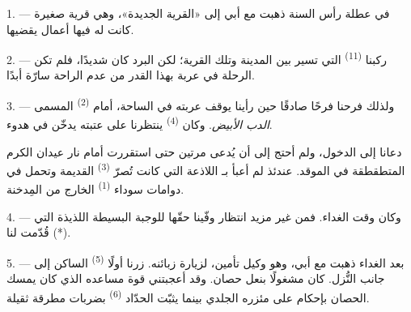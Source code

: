 

\VUsaut{4.0mm}
\VUsaut{3.0mm}
\VUfilet{16mm}
\VUsaut{5.6mm}
\VUsaut{3.0mm}

\VUsaut{3.0mm}

\VUsaut{4.0mm}

1. --- في عطلة رأس السنة ذهبت مع أبي إلى «القرية الجديدة»، وهي قرية
صغيرة كانت له فيها أعمال يقضيها.

2. --- ركبنا  \textsuperscript{(11)} التي تسير بين المدينة
وتلك القرية؛ لكن البرد كان شديدًا، فلم تكن الرحلة في عربة بهذا القدر من
عدم الراحة سارّة أبدًا.

3. --- ولذلك فرحنا فرحًا صادقًا حين رأينا  يوقف عربته في
الساحة، أمام  \textsuperscript{(2)} المسمى \textit{الدب الأبيض}.
وكان  \textsuperscript{(4)} ينتظرنا على عتبته يدخّن
 في هدوء.

دعانا إلى الدخول، ولم أحتج إلى أن يُدعى مرتين حتى استقررت أمام نار عيدان
الكرم المتطقطقة في الموقد. عندئذ لم أعبأ بـ
اللاذعة التي كانت تُصرّ  \textsuperscript{(3)} القديمة وتحمل في
دوامات سوداء  \textsuperscript{(1)} الخارج من المِدخنة.

4. --- وكان وقت الغداء. فمن غير مزيد انتظار وفّينا حقّها للوجبة البسيطة
اللذيذة التي قُدّمت لنا (*).

\VUsaut{3.0mm}

5. --- بعد الغداء ذهبت مع أبي، وهو وكيل تأمين، لزيارة زبائنه. زرنا أولًا
 \textsuperscript{(5)} الساكن إلى جانب النُّزل. كان مشغولًا
بنعل حصان. وقد أعجبتني قوة مساعده الذي كان يمسك  الحصان
بإحكام على مئزره الجلدي بينما يثبّت الحدّاد  \textsuperscript{(6)}
بضربات مطرقة ثقيلة.

